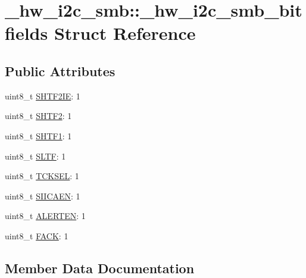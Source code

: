 \hypertarget{struct__hw__i2c__smb_1_1__hw__i2c__smb__bitfields}{}\section{\+\_\+hw\+\_\+i2c\+\_\+smb\+:\+:\+\_\+hw\+\_\+i2c\+\_\+smb\+\_\+bitfields Struct Reference}
\label{struct__hw__i2c__smb_1_1__hw__i2c__smb__bitfields}
\subsection*{Public Attributes}
\begin{DoxyCompactItemize}
\item 
uint8\+\_\+t \hyperlink{struct__hw__i2c__smb_1_1__hw__i2c__smb__bitfields_ae608ae9015771af032c78fb73af5180a}{S\+H\+T\+F2\+IE}\+: 1
\item 
uint8\+\_\+t \hyperlink{struct__hw__i2c__smb_1_1__hw__i2c__smb__bitfields_a01486147e051c2ce48bd12a1db4e4066}{S\+H\+T\+F2}\+: 1
\item 
uint8\+\_\+t \hyperlink{struct__hw__i2c__smb_1_1__hw__i2c__smb__bitfields_a7eb30cddb7302ce66ca962b1bfb89623}{S\+H\+T\+F1}\+: 1
\item 
uint8\+\_\+t \hyperlink{struct__hw__i2c__smb_1_1__hw__i2c__smb__bitfields_a42607d426272eea995b551d134f3898b}{S\+L\+TF}\+: 1
\item 
uint8\+\_\+t \hyperlink{struct__hw__i2c__smb_1_1__hw__i2c__smb__bitfields_a8d6f6dab58b178196790e44adcc9064e}{T\+C\+K\+S\+EL}\+: 1
\item 
uint8\+\_\+t \hyperlink{struct__hw__i2c__smb_1_1__hw__i2c__smb__bitfields_a89449ab591ad157908dcc9690887be31}{S\+I\+I\+C\+A\+EN}\+: 1
\item 
uint8\+\_\+t \hyperlink{struct__hw__i2c__smb_1_1__hw__i2c__smb__bitfields_a727ac812afacb472f328a0ab9ec16d49}{A\+L\+E\+R\+T\+EN}\+: 1
\item 
uint8\+\_\+t \hyperlink{struct__hw__i2c__smb_1_1__hw__i2c__smb__bitfields_a605d497582411989378ff7db887bd222}{F\+A\+CK}\+: 1
\end{DoxyCompactItemize}


\subsection{Member Data Documentation}
